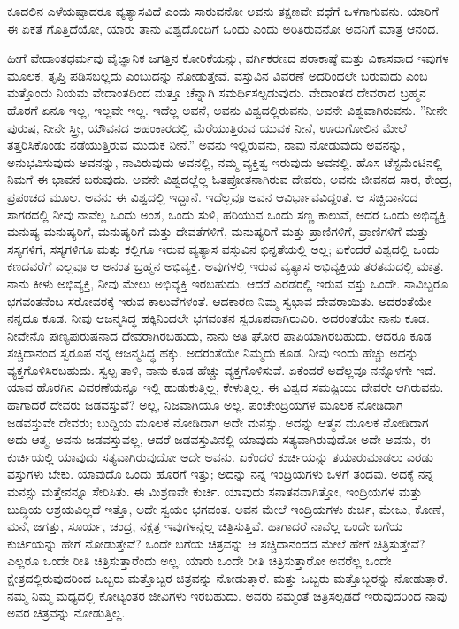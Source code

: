ಕೂದಲಿನ ಎಳೆಯಷ್ಟಾದರೂ ವ್ಯತ್ಯಾಸವಿದೆ ಎಂದು ಸಾರುವನೋ ಅವನು ತಕ್ಷಣವೇ ವಧೆಗೆ ಒಳಗಾಗುವನು. ಯಾರಿಗೆ ಈ ಏಕತೆ ಗೊತ್ತಿದೆಯೋ, ಯಾರು ತಾನು ವಿಶ್ವದೊಂದಿಗೆ ಒಂದು ಎಂದು ಅರಿತಿರುವನೋ ಅವನಿಗೆ ಮಾತ್ರ ಆನಂದ.

ಹೀಗೆ ವೇದಾಂತಧರ್ಮವು ವೈಜ್ಞಾನಿಕ ಜಗತ್ತಿನ ಕೋರಿಕೆಯನ್ನು, ವರ್ಗಿಕರಣದ ಪರಾಕಾಷ್ಠೆ ಮತ್ತು ವಿಕಾಸವಾದ ಇವುಗಳ ಮೂಲಕ, ತೃಪ್ತಿ ಪಡಿಸಬಲ್ಲದು ಎಂಬುದನ್ನು ನೋಡುತ್ತೇವೆ. ವಸ್ತುವಿನ ವಿವರಣೆ ಅದರಿಂದಲೇ ಬರುವುದು ಎಂಬ ಮತ್ತೊಂದು ನಿಯಮ ವೇದಾಂತದಿಂದ ಮತ್ತೂ ಚೆನ್ನಾಗಿ ಸಮರ್ಥಿಸಲ್ಪಡುವುದು. ವೇದಾಂತದ ದೇವರಾದ ಬ್ರಹ್ಮನ ಹೊರಗೆ ಏನೂ ಇಲ್ಲ, ಇಲ್ಲವೇ ಇಲ್ಲ. ಇದೆಲ್ಲ ಅವನೆ, ಅವನು ವಿಶ್ವದಲ್ಲಿರುವನು, ಅವನೇ ವಿಶ್ವವಾಗಿರುವನು. ''ನೀನೇ ಪುರುಷ, ನೀನೇ ಸ್ತ್ರೀ, ಯೌವನದ ಅಹಂಕಾರದಲ್ಲಿ ಮೆರೆಯುತ್ತಿರುವ ಯುವಕ ನೀನೆ, ಊರುಗೋಲಿನ ಮೇಲೆ ತತ್ತರಿಸಿಕೊಂಡು ನಡೆಯುತ್ತಿರುವ ಮುದುಕ ನೀನೆ.” ಅವನು ಇಲ್ಲಿರುವನು, ನಾವು ನೋಡುವುದು ಅವನನ್ನು, ಅನುಭವಿಸುವುದು ಅವನನ್ನು, ನಾವಿರುವುದು ಅವನಲ್ಲಿ, ನಮ್ಮ ವ್ಯಕ್ತಿತ್ವ ಇರುವುದು ಅವನಲ್ಲಿ. ಹೊಸ ಟೆಸ್ಟಮೆಂಟಿನಲ್ಲಿ ನಿಮಗೆ ಈ ಭಾವನೆ ಬರುವುದು. ಅವನೇ ವಿಶ್ವದಲ್ಲೆಲ್ಲ ಓತಪ್ರೋತನಾಗಿರುವ ದೇವರು, ಅವನು ಜೀವನದ ಸಾರ, ಕೇಂದ್ರ, ಪ್ರಪಂಚದ ಮೂಲ. ಅವನು ಈ ವಿಶ್ವದಲ್ಲಿ ಇದ್ದಾನೆ. ಇದೆಲ್ಲವೂ ಅವನ ಆವಿರ್ಭಾವವಿದ್ದಂತೆ. ಆ ಸಚ್ಚಿದಾನಂದ ಸಾಗರದಲ್ಲಿ ನೀವು ನಾವೆಲ್ಲ ಒಂದು ಅಂಶ, ಒಂದು ಸುಳಿ, ಹರಿಯುವ ಒಂದು ಸಣ್ಣ ಕಾಲುವೆ, ಅದರ ಒಂದು ಅಭಿವ್ಯಕ್ತಿ. ಮನುಷ್ಯ ಮನುಷ್ಯರಿಗೆ, ಮನುಷ್ಯರಿಗೆ ಮತ್ತು ದೇವತೆಗಳಿಗೆ, ಮನುಷ್ಯರಿಗೆ ಮತ್ತು ಪ್ರಾಣಿಗಳಿಗೆ, ಪ್ರಾಣಿಗಳಿಗೆ ಮತ್ತು ಸಸ್ಯಗಳಿಗೆ, ಸಸ್ಯಗಳಿಗೂ ಮತ್ತು ಕಲ್ಲಿಗೂ ಇರುವ ವ್ಯತ್ಯಾಸ ವಸ್ತುವಿನ ಭಿನ್ನತೆಯಲ್ಲಿ ಅಲ್ಲ; ಏಕೆಂದರೆ ವಿಶ್ವದಲ್ಲಿ ಒಂದು ಕಣದವರೆಗೆ ಎಲ್ಲವೂ ಆ ಅನಂತ ಬ್ರಹ್ಮನ ಅಭಿವ್ಯಕ್ತಿ. ಅವುಗಳಲ್ಲಿ ಇರುವ ವ್ಯತ್ಯಾಸ ಅಭಿವ್ಯಕ್ತಿಯ ತರತಮದಲ್ಲಿ ಮಾತ್ರ. ನಾನು ಕೀಳು ಅಭಿವ್ಯಕ್ತಿ, ನೀವು ಮೇಲು ಅಭಿವ್ಯಕ್ತಿ ಇರಬಹುದು. ಆದರೆ ಎರಡರಲ್ಲಿ ಇರುವ ವಸ್ತು ಒಂದೇ. ನಾವಿಬ್ಬರೂ ಭಗವಂತನೆಂಬ ಸರೋವರಕ್ಕೆ ಇರುವ ಕಾಲುವೆಗಳಂತೆ. ಆದಕಾರಣ ನಿಮ್ಮ ಸ್ವಭಾವ ದೇವರಾಯಿತು. ಅದರಂತೆಯೇ ನನ್ನದೂ ಕೂಡ. ನೀವು ಆಜನ್ಮಸಿದ್ಧ ಹಕ್ಕಿನಿಂದಲೇ ಭಗವಂತನ ಸ್ವರೂಪವಾಗಿರುವಿರಿ. ಅದರಂತೆಯೇ ನಾನು ಕೂಡ. ನೀವೇನೊ ಪುಣ್ಯಪುರುಷನಾದ ದೇವರಾಗಿರಬಹುದು, ನಾನು ಅತಿ ಘೋರ ಪಾಪಿಯಾಗಿರಬಹುದು. ಆದರೂ ಕೂಡ ಸಚ್ಚಿದಾನಂದ ಸ್ವರೂಪ ನನ್ನ ಆಜನ್ಮಸಿದ್ಧ ಹಕ್ಕು. ಅದರಂತೆಯೇ ನಿಮ್ಮದು ಕೂಡ. ನೀವು ಇಂದು ಹೆಚ್ಚು ಅದನ್ನು ವ್ಯಕ್ತಗೊಳಿಸಿರಬಹುದು. ಸ್ವಲ್ಪ ತಾಳಿ, ನಾನು ಕೂಡ ಹೆಚ್ಚು ವ್ಯಕ್ತಗೊಳಿಸುವೆ. ಏಕೆಂದರೆ ಅದೆಲ್ಲವೂ ನನ್ನೊಳಗೇ ಇದೆ. ಯಾವ ಹೊರಗಿನ ವಿವರಣೆಯನ್ನೂ ಇಲ್ಲಿ ಹುಡುಕುತ್ತಿಲ್ಲ, ಕೇಳುತ್ತಿಲ್ಲ. ಈ ವಿಶ್ವದ ಸಮಷ್ಟಿಯು ದೇವರೇ ಆಗಿರುವನು. ಹಾಗಾದರೆ ದೇವರು ಜಡವಸ್ತುವೆ? ಅಲ್ಲ, ನಿಜವಾಗಿಯೂ ಅಲ್ಲ. ಪಂಚೇಂದ್ರಿಯಗಳ ಮೂಲಕ ನೋಡಿದಾಗ ಜಡವಸ್ತುವೇ ದೇವರು; ಬುದ್ದಿಯ ಮೂಲಕ ನೋಡಿದಾಗ ಅದೇ ಮನಸ್ಸು. ಅದನ್ನು ಆತ್ಮನ ಮೂಲಕ ನೋಡಿದಾಗ ಅದು ಆತ್ಮ, ಅವನು ಜಡವಸ್ತುವಲ್ಲ, ಆದರೆ ಜಡವಸ್ತುವಿನಲ್ಲಿ ಯಾವುದು ಸತ್ಯವಾಗಿರುವುದೋ ಅದೇ ಅವನು, ಈ ಕುರ್ಚಿಯಲ್ಲಿ ಯಾವುದು ಸತ್ಯವಾಗಿರುವುದೋ ಅದೇ ಅವನು. ಏಕೆಂದರೆ ಕುರ್ಚಿಯನ್ನು ತಯಾರುಮಾಡಲು ಎರಡು ವಸ್ತುಗಳು ಬೇಕು. ಯಾವುದೊ ಒಂದು ಹೊರಗೆ ಇತ್ತು; ಅದನ್ನು ನನ್ನ ಇಂದ್ರಿಯಗಳು ಒಳಗೆ ತಂದವು. ಅದಕ್ಕೆ ನನ್ನ ಮನಸ್ಸು ಮತ್ತೇನನ್ನೂ ಸೇರಿಸಿತು. ಈ ಮಿಶ್ರಣವೇ ಕುರ್ಚಿ. ಯಾವುದು ಸನಾತನವಾಗಿತ್ತೋ, ಇಂದ್ರಿಯಗಳ ಮತ್ತು ಬುದ್ಧಿಯ ಆಶ್ರಯವಿಲ್ಲದೆ ಇತ್ತೊ, ಅದೇ ಸ್ವಯಂ ಭಗವಂತ. ಅವನ ಮೇಲೆ ಇಂದ್ರಿಯಗಳು ಕುರ್ಚಿ, ಮೇಜು, ಕೋಣೆ, ಮನೆ, ಜಗತ್ತು, ಸೂರ್ಯ, ಚಂದ್ರ, ನಕ್ಷತ್ರ ಇವುಗಳನ್ನೆಲ್ಲ ಚಿತ್ರಿಸುತ್ತಿವೆ. ಹಾಗಾದರೆ ನಾವೆಲ್ಲ ಒಂದೇ ಬಗೆಯ ಕುರ್ಚಿಯನ್ನು ಹೇಗೆ ನೋಡುತ್ತೇವೆ? ಒಂದೇ ಬಗೆಯ ಚಿತ್ರವನ್ನು ಆ ಸಚ್ಚಿದಾನಂದದ ಮೇಲೆ ಹೇಗೆ ಚಿತ್ರಿಸುತ್ತೇವೆ? ಎಲ್ಲರೂ ಒಂದೇ ರೀತಿ ಚಿತ್ರಿಸುತ್ತಾರೆಂದು ಅಲ್ಲ. ಯಾರು ಒಂದೇ ರೀತಿ ಚಿತ್ರಿಸುತ್ತಾರೋ ಅವರೆಲ್ಲ ಒಂದೇ ಕ್ಷೇತ್ರದಲ್ಲಿರುವುದರಿಂದ ಒಬ್ಬರು ಮತ್ತೊಬ್ಬರ ಚಿತ್ರವನ್ನು ನೋಡುತ್ತಾರೆ. ಮತ್ತು ಒಬ್ಬರು ಮತ್ತೊಬ್ಬರನ್ನು ನೋಡುತ್ತಾರೆ. ನಮ್ಮ ನಿಮ್ಮ ಮಧ್ಯದಲ್ಲಿ ಕೋಟ್ಯಂತರ ಜೀವಿಗಳು ಇರಬಹುದು. ಅವರು ನಮ್ಮಂತೆ ಚಿತ್ರಿಸಲ್ಪಡದೆ ಇರುವುದರಿಂದ ನಾವು ಅವರ ಚಿತ್ರವನ್ನು ನೋಡುತ್ತಿಲ್ಲ.

